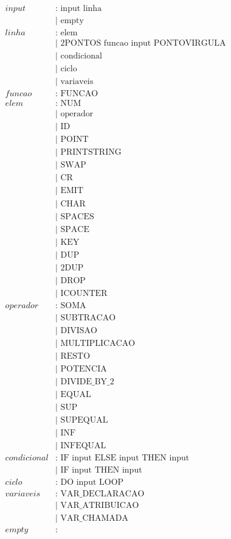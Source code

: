 \documentclass{article}
\begin{document}
\begin{align*}
input & : \text{ input linha} \\
      & | \text{ empty} \\
linha & : \text{ elem} \\
      & | \text{ 2PONTOS funcao input PONTOVIRGULA} \\
      & | \text{ condicional} \\
      & | \text{ ciclo} \\
      & | \text{ variaveis} \\
funcao & : \text{ FUNCAO} \\
elem & : \text{ NUM} \\
     & | \text{ operador} \\
     & | \text{ ID} \\
     & | \text{ POINT} \\
     & | \text{ PRINTSTRING} \\
     & | \text{ SWAP} \\
     & | \text{ CR} \\
     & | \text{ EMIT} \\
     & | \text{ CHAR} \\
     & | \text{ SPACES} \\
     & | \text{ SPACE} \\
     & | \text{ KEY} \\
     & | \text{ DUP} \\
     & | \text{ 2DUP} \\
     & | \text{ DROP} \\
     & | \text{ ICOUNTER} \\
operador & : \text{ SOMA} \\
         & | \text{ SUBTRACAO} \\
         & | \text{ DIVISAO} \\
         & | \text{ MULTIPLICACAO} \\
         & | \text{ RESTO} \\
         & | \text{ POTENCIA} \\
         & | \text{ DIVIDE\_BY\_2} \\
         & | \text{ EQUAL} \\
         & | \text{ SUP} \\
         & | \text{ SUPEQUAL} \\
         & | \text{ INF} \\
         & | \text{ INFEQUAL} \\
condicional & : \text{ IF input ELSE input THEN input} \\
            & | \text{ IF input THEN input} \\
ciclo & : \text{ DO input LOOP} \\
variaveis & : \text{ VAR\_DECLARACAO} \\
         & | \text{ VAR\_ATRIBUICAO} \\
         & | \text{ VAR\_CHAMADA} \\
empty & : \\
\end{align*}
\end{document}
